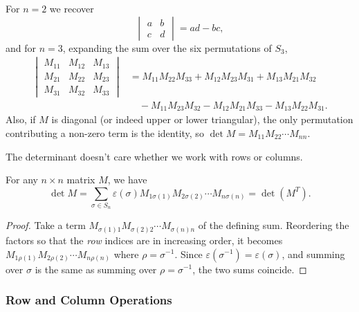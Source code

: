 \begin{example}
	For $n = 2$ we recover
	$$
	\begin{vmatrix}
		a & b \\ c & d
	\end{vmatrix} = ad - bc,
	$$
	and for $n = 3$, expanding the sum over the six permutations of $S_3$,
	\begin{align*}
	\begin{vmatrix}
		M_{11} & M_{12} & M_{13} \\
		M_{21} & M_{22} & M_{23} \\
		M_{31} & M_{32} & M_{33}
	\end{vmatrix}
	&= M_{11}M_{22}M_{33} + M_{12}M_{23}M_{31} + M_{13}M_{21}M_{32} \\
	&\quad - M_{11}M_{23}M_{32} - M_{12}M_{21}M_{33} - M_{13}M_{22}M_{31}.
	\end{align*}
	Also, if $M$ is diagonal (or indeed upper or lower triangular), the only permutation contributing a non-zero term is the identity, so $\det M = M_{11}M_{22}\cdots M_{nn}$.
\end{example}

The determinant doesn't care whether we work with rows or columns.

\begin{proposition}[$\det M^T = \det M$]
	For any $n \times n$ matrix $M$, we have
	$$
	\det M = \sum_{\sigma \in S_n} \varepsilon(\sigma)M_{1 \sigma(1)}M_{2\sigma(2)}\cdots M_{n \sigma(n)} = \det (M^T).
	$$
\end{proposition}
\begin{proof}
	Take a term $M_{\sigma(1)1}M_{\sigma(2)2}\cdots M_{\sigma(n)n}$ of the defining sum. Reordering the factors so that the \emph{row} indices are in increasing order, it becomes $M_{1\rho(1)}M_{2\rho(2)}\cdots M_{n\rho(n)}$ where $\rho = \sigma^{-1}$. Since $\varepsilon(\sigma^{-1}) = \varepsilon(\sigma)$, and summing over $\sigma$ is the same as summing over $\rho = \sigma^{-1}$, the two sums coincide.
\end{proof}

\subsubsection{Row and Column Operations}

